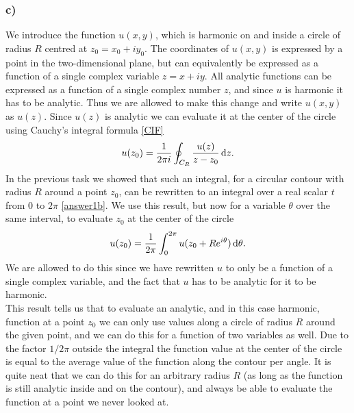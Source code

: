 \documentclass[12pt,twoside]{article}
\begin{document}
\subsubsection*{c)}
We introduce the function $u(x, y)$, which is harmonic on and inside a circle of radius $R$ centred at $z_0=x_0+iy_0$. The coordinates of $u(x, y)$ is expressed by a point in the two-dimensional plane, but can equivalently be expressed as a function of a single complex variable $z=x+iy$. All analytic functions can be expressed as a function of a single complex number $z$, and since $u$ is harmonic it has to be analytic. Thus we are allowed to make this change and write $u(x, y)$ as $u(z)$. Since $u(z)$ is analytic we can evaluate it at the center of the circle using Cauchy's integral formula \eqref{CIF}
\begin{equation}
  u(z_0) = \frac{1}{2\pi i} \oint_{C_R} \frac{u(z)}{z-z_0}\dif z.
\end{equation}
In the previous task we showed that such an integral, for a circular contour with radius $R$ around a point $z_0$, can be rewritten to an integral over a real scalar $t$ from $0$ to $2\pi$ \eqref{answer1b}. We use this result, but now for a variable $\theta$ over the same interval, to evaluate $z_0$ at the center of the circle
\begin{equation}
  u(z_0) = \frac{1}{2\pi} \int_{0}^{2\pi} u(z_0+Re^{i\theta}) \dif \theta.
\end{equation}
We are allowed to do this since we have rewritten $u$ to only be a function of a single complex variable, and the fact that $u$ has to be analytic for it to be harmonic.\\
This result tells us that to evaluate an analytic, and in this case harmonic, function at a point $z_0$ we can only use values along a circle of radius $R$ around the given point, and we can do this for a function of two variables as well. Due to the factor $1/2\pi$ outside the integral the function value at the center of the circle is equal to the average value of the function along the contour per angle. It is quite neat that we can do this for an arbitrary radius $R$ (as long as the function is still analytic inside and on the contour), and always be able to evaluate the function at a point we never looked at.
\end{document}

